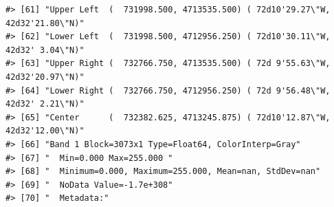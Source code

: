 \documentclass[
]{book}
\begin{document}
\begin{verbatim}
#> [61] "Upper Left  (  731998.500, 4713535.500) ( 72d10'29.27\"W, 42d32'21.80\"N)"                                                                                                                                                                                                      
#> [62] "Lower Left  (  731998.500, 4712956.250) ( 72d10'30.11\"W, 42d32' 3.04\"N)"                                                                                                                                                                                                      
#> [63] "Upper Right (  732766.750, 4713535.500) ( 72d 9'55.63\"W, 42d32'20.97\"N)"                                                                                                                                                                                                      
#> [64] "Lower Right (  732766.750, 4712956.250) ( 72d 9'56.48\"W, 42d32' 2.21\"N)"                                                                                                                                                                                                      
#> [65] "Center      (  732382.625, 4713245.875) ( 72d10'12.87\"W, 42d32'12.00\"N)"                                                                                                                                                                                                      
#> [66] "Band 1 Block=3073x1 Type=Float64, ColorInterp=Gray"                                                                                                                                                                                                                             
#> [67] "  Min=0.000 Max=255.000 "                                                                                                                                                                                                                                                       
#> [68] "  Minimum=0.000, Maximum=255.000, Mean=nan, StdDev=nan"                                                                                                                                                                                                                         
#> [69] "  NoData Value=-1.7e+308"                                                                                                                                                                                                                                                       
#> [70] "  Metadata:"                                                                                                                                                                                                                                                                    

\end{verbatim}
\end{document}
